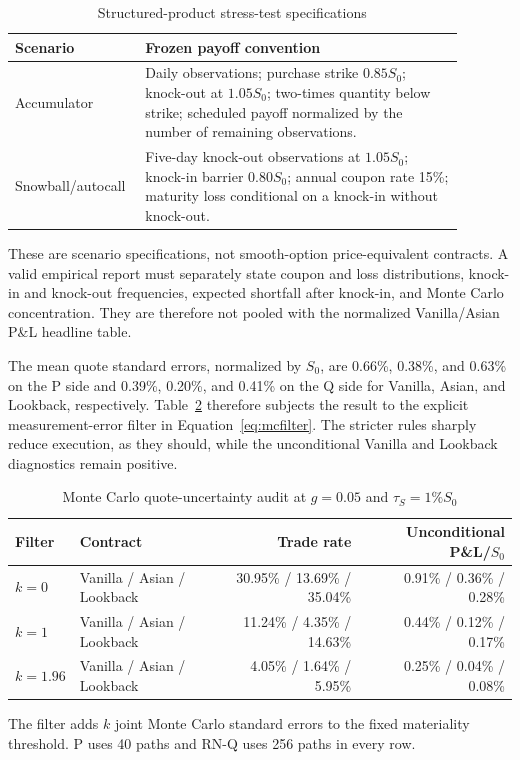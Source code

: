﻿\documentclass[12pt,letterpaper]{article}
\newcommand{\tabnote}[1]{\begin{minipage}{\linewidth}\vspace{4pt}\footnotesize\singlespacing #1\end{minipage}}
\begin{document}
\begin{table}[ht]
\singlespacing
\centering
\caption{Structured-product stress-test specifications}
\label{tab:structured-scenarios}
\begin{tabular}{p{0.22\linewidth}p{0.67\linewidth}}
\toprule
Scenario & Frozen payoff convention \\
\midrule
Accumulator & Daily observations; purchase strike $0.85S_0$; knock-out at
$1.05S_0$; two-times quantity below strike; scheduled payoff normalized by
the number of remaining observations. \\
Snowball/autocall & Five-day knock-out observations at $1.05S_0$; knock-in
barrier $0.80S_0$; annual coupon rate 15\%; maturity loss conditional on a
knock-in without knock-out. \\
\bottomrule
\end{tabular}
\tabnote{These are scenario specifications, not smooth-option price-equivalent
contracts. A valid empirical report must separately state coupon and loss
distributions, knock-in and knock-out frequencies, expected shortfall after
knock-in, and Monte Carlo concentration. They are therefore not pooled with
the normalized Vanilla/Asian P\&L headline table.}
\end{table}

The mean quote standard errors, normalized by $S_0$, are 0.66\%, 0.38\%, and
0.63\% on the P side and 0.39\%, 0.20\%, and 0.41\% on the Q side for Vanilla,
Asian, and Lookback, respectively. Table~\ref{tab:mcfilter} therefore subjects
the result to the explicit measurement-error filter in
Equation~\eqref{eq:mcfilter}. The stricter rules sharply reduce execution, as
they should, while the unconditional Vanilla and Lookback diagnostics remain
positive.

\begin{table}[ht]
\singlespacing
\centering
\caption{Monte Carlo quote-uncertainty audit at $g=0.05$ and $\tau_S=1\%S_0$}
\label{tab:mcfilter}
\begin{tabular}{llrr}
\toprule
Filter & Contract & Trade rate & Unconditional P\&L/$S_0$ \\
\midrule
$k=0$ & Vanilla / Asian / Lookback & 30.95\% / 13.69\% / 35.04\% & 0.91\% / 0.36\% / 0.28\% \\
$k=1$ & Vanilla / Asian / Lookback & 11.24\% / 4.35\% / 14.63\% & 0.44\% / 0.12\% / 0.17\% \\
$k=1.96$ & Vanilla / Asian / Lookback & 4.05\% / 1.64\% / 5.95\% & 0.25\% / 0.04\% / 0.08\% \\
\bottomrule
\end{tabular}
\tabnote{The filter adds $k$ joint Monte Carlo standard errors to the fixed
materiality threshold. P uses 40 paths and RN-Q uses 256 paths in every row.}
\end{table}
\end{document}
